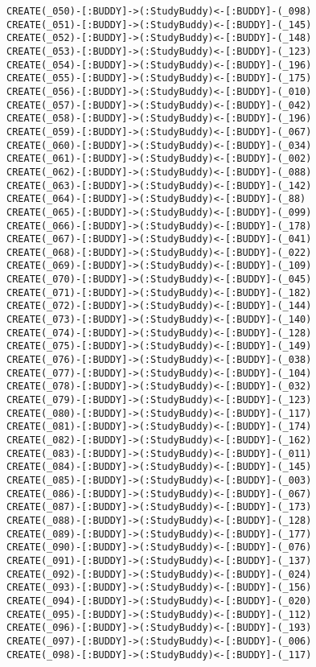 \begin{lstlisting}
CREATE(_050)-[:BUDDY]->(:StudyBuddy)<-[:BUDDY]-(_098)
CREATE(_051)-[:BUDDY]->(:StudyBuddy)<-[:BUDDY]-(_145)
CREATE(_052)-[:BUDDY]->(:StudyBuddy)<-[:BUDDY]-(_148)
CREATE(_053)-[:BUDDY]->(:StudyBuddy)<-[:BUDDY]-(_123)
CREATE(_054)-[:BUDDY]->(:StudyBuddy)<-[:BUDDY]-(_196)
CREATE(_055)-[:BUDDY]->(:StudyBuddy)<-[:BUDDY]-(_175)
CREATE(_056)-[:BUDDY]->(:StudyBuddy)<-[:BUDDY]-(_010)
CREATE(_057)-[:BUDDY]->(:StudyBuddy)<-[:BUDDY]-(_042)
CREATE(_058)-[:BUDDY]->(:StudyBuddy)<-[:BUDDY]-(_196)
CREATE(_059)-[:BUDDY]->(:StudyBuddy)<-[:BUDDY]-(_067)
CREATE(_060)-[:BUDDY]->(:StudyBuddy)<-[:BUDDY]-(_034)
CREATE(_061)-[:BUDDY]->(:StudyBuddy)<-[:BUDDY]-(_002)
CREATE(_062)-[:BUDDY]->(:StudyBuddy)<-[:BUDDY]-(_088)
CREATE(_063)-[:BUDDY]->(:StudyBuddy)<-[:BUDDY]-(_142)
CREATE(_064)-[:BUDDY]->(:StudyBuddy)<-[:BUDDY]-(_88)
CREATE(_065)-[:BUDDY]->(:StudyBuddy)<-[:BUDDY]-(_099)
CREATE(_066)-[:BUDDY]->(:StudyBuddy)<-[:BUDDY]-(_178)
CREATE(_067)-[:BUDDY]->(:StudyBuddy)<-[:BUDDY]-(_041)
CREATE(_068)-[:BUDDY]->(:StudyBuddy)<-[:BUDDY]-(_022)
CREATE(_069)-[:BUDDY]->(:StudyBuddy)<-[:BUDDY]-(_109)
CREATE(_070)-[:BUDDY]->(:StudyBuddy)<-[:BUDDY]-(_045)
CREATE(_071)-[:BUDDY]->(:StudyBuddy)<-[:BUDDY]-(_182)
CREATE(_072)-[:BUDDY]->(:StudyBuddy)<-[:BUDDY]-(_144)
CREATE(_073)-[:BUDDY]->(:StudyBuddy)<-[:BUDDY]-(_140)
CREATE(_074)-[:BUDDY]->(:StudyBuddy)<-[:BUDDY]-(_128)
CREATE(_075)-[:BUDDY]->(:StudyBuddy)<-[:BUDDY]-(_149)
CREATE(_076)-[:BUDDY]->(:StudyBuddy)<-[:BUDDY]-(_038)
CREATE(_077)-[:BUDDY]->(:StudyBuddy)<-[:BUDDY]-(_104)
CREATE(_078)-[:BUDDY]->(:StudyBuddy)<-[:BUDDY]-(_032)
CREATE(_079)-[:BUDDY]->(:StudyBuddy)<-[:BUDDY]-(_123)
CREATE(_080)-[:BUDDY]->(:StudyBuddy)<-[:BUDDY]-(_117)
CREATE(_081)-[:BUDDY]->(:StudyBuddy)<-[:BUDDY]-(_174)
CREATE(_082)-[:BUDDY]->(:StudyBuddy)<-[:BUDDY]-(_162)
CREATE(_083)-[:BUDDY]->(:StudyBuddy)<-[:BUDDY]-(_011)
CREATE(_084)-[:BUDDY]->(:StudyBuddy)<-[:BUDDY]-(_145)
CREATE(_085)-[:BUDDY]->(:StudyBuddy)<-[:BUDDY]-(_003)
CREATE(_086)-[:BUDDY]->(:StudyBuddy)<-[:BUDDY]-(_067)
CREATE(_087)-[:BUDDY]->(:StudyBuddy)<-[:BUDDY]-(_173)
CREATE(_088)-[:BUDDY]->(:StudyBuddy)<-[:BUDDY]-(_128)
CREATE(_089)-[:BUDDY]->(:StudyBuddy)<-[:BUDDY]-(_177)
CREATE(_090)-[:BUDDY]->(:StudyBuddy)<-[:BUDDY]-(_076)
CREATE(_091)-[:BUDDY]->(:StudyBuddy)<-[:BUDDY]-(_137)
CREATE(_092)-[:BUDDY]->(:StudyBuddy)<-[:BUDDY]-(_024)
CREATE(_093)-[:BUDDY]->(:StudyBuddy)<-[:BUDDY]-(_156)
CREATE(_094)-[:BUDDY]->(:StudyBuddy)<-[:BUDDY]-(_020)
CREATE(_095)-[:BUDDY]->(:StudyBuddy)<-[:BUDDY]-(_112)
CREATE(_096)-[:BUDDY]->(:StudyBuddy)<-[:BUDDY]-(_193)
CREATE(_097)-[:BUDDY]->(:StudyBuddy)<-[:BUDDY]-(_006)
CREATE(_098)-[:BUDDY]->(:StudyBuddy)<-[:BUDDY]-(_117)

\end{lstlisting}
